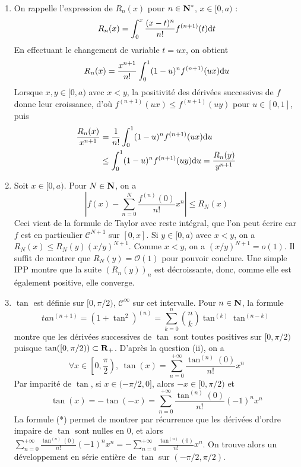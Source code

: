 \begin{correction}\hfill
	\begin{enumerate}
        \item On rappelle l'expression de $R_n(x)$ pour $n\in\operatorname{\mathbf{N}}^*$, $x\in[0,a)$ :
        \[
            R_n(x)=\int_0^x\frac{(x-t)^n}{n!}f^{(n+1)}(t)\mathrm{d} t
        \]
        En effectuant le changement de variable $t=ux$, on obtient 
        \[
            R_n(x)=\frac{x^{n+1}}{n!}\int_0^1(1-u)^nf^{(n+1)}(ux)\mathrm{d} u
        \]
        Lorsque $x,y\in[0,a)$ avec $x<y$, la positivité des dérivées successives de $f$ donne leur croissance,
        d'où $f^{(n+1)}(ux)\leq f^{(n+1)}(uy)$ pour $u\in[0,1]$, puis
        \begin{align*}
            \frac{R_n(x)}{x^{n+1}}&=\frac1{n!}\int_0^1(1-u)^nf^{(n+1)}(ux)\mathrm{d} u\\
                                  &\leq \int_0^1(1-u)^nf^{(n+1)}(uy)\mathrm{d} u=\frac{R_n(y)}{y^{n+1}}
        \end{align*}\newpage
        \item Soit $x\in[0,a)$. Pour $N\in\operatorname{\mathbf{N}}$, on a 
        \[
            \left|f(x)-\sum_{n=0}^N\frac{f^{(n)}(0)}{n!}x^n\right|\leq R_N(x)
        \]
        Ceci vient de la formule de Taylor avec reste intégral, que l'on peut écrire car $f$ est en particulier $\mathcal C^{N+1}$ sur $[0,x]$.
        Si $y\in[0,a)$ avec $x<y$, on a $R_N(x)\leq R_N(y)(x/y)^{N+1}$.
        Comme $x<y$, on a $(x/y)^{N+1}=o(1)$. Il suffit de montrer que $R_N(y)=\mathcal O(1)$ pour pouvoir conclure.
        Une simple IPP montre que la suite $(R_n(y))_n$ est décroissante, donc, comme elle est également positive, elle converge.

        \item $\tan$ est définie sur $[0,\pi/2)$, $\mathcal C^\infty$ sur cet intervalle. 
        Pour $n\in\operatorname{\mathbf{N}}$, la formule
        \[
            tan^{(n+1)}=(1+\tan^2)^{(n)}=\sum_{k=0}^n\binom nk\tan^{(k)}\tan^{(n-k)}    \tag*{(*)}
        \]
        montre que les dérivées successives de $\tan$ sont toutes positives sur $[0,\pi/2)$ puisque $\tan([0,\pi/2))\subset\operatorname{\mathbf{R}}_+$.
        D'après la question (ii), on a 
        \[
            \forall x\in\left[0,\frac\pi2\right),\ \tan(x)=\sum_{n=0}^{+\infty}\frac{\tan^{(n)}(0)}{n!}x^n
        \]
        Par imparité de $\tan$, si $x\in(-\pi/2,0]$, alors $-x\in[0,\pi/2)$ et 
        \[
            \tan(x)=-\tan(-x)=\sum_{n=0}^{+\infty}\frac{\tan^{(n)}(0)}{n!}(-1)^nx^n   
        \]
        La formule (*) permet de montrer par récurrence que les dérivées d'ordre impaire de $\tan$ sont nulles en 0, et alors $\sum_{n=0}^{+\infty}\frac{\tan^{(n)}(0)}{n!}(-1)^nx^n=-\sum_{n=0}^{+\infty}\frac{\tan^{(n)}(0)}{n!}x^n$.
        On trouve alors un développement en série entière de $\tan$ sur $(-\pi/2,\pi/2)$.
    \end{enumerate}
\end{correction}
